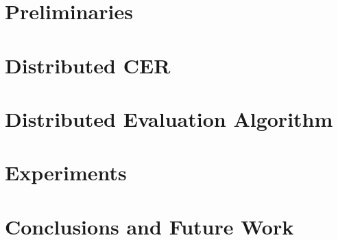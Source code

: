 \documentclass[xcolor=pdftex,dvipsnames,table]{beamer}
\begin{document}

\section{Preliminaries}


\section{Distributed CER}



\section{Distributed Evaluation Algorithm}



\section{Experiments}



\section{Conclusions and Future Work}
\end{document}
